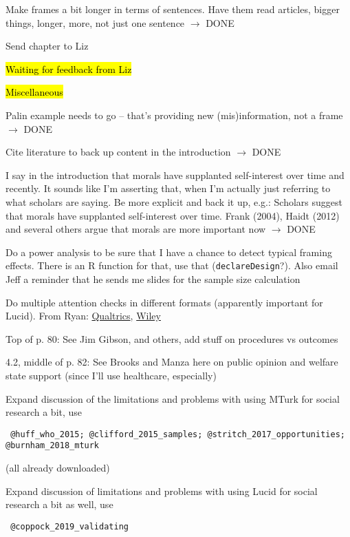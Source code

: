 \begin{coi}
\begin{coi}
				\item Make frames a bit longer in terms of sentences. Have them read articles, bigger things, longer, more, not just one sentence $\rightarrow$ DONE
			\end{coi}
		\item Send chapter to Liz
		\item \hl{Waiting for feedback from Liz}
		\item \hl{Miscellaneous}
			\begin{coi}
				\item Palin example needs to go -- that's providing new (mis)information, not a frame $\rightarrow$ DONE
				\item Cite literature to back up content in the introduction $\rightarrow$ DONE
				\item I say in the introduction that morals have supplanted self-interest over time and recently. It sounds like I'm asserting that, when I'm actually just referring to what scholars are saying. Be more explicit and back it up, e.g.: Scholars suggest that morals have supplanted self-interest over time. Frank (2004), Haidt (2012) and several others argue that morals are more important now $\rightarrow$ DONE
				\item Do a power analysis to be sure that I have a chance to detect typical framing effects. There is an R function for that, use that (\texttt{declareDesign}?). Also 	email Jeff a reminder that he sends me slides for the sample size calculation
				\item Do multiple attention checks in different formats (apparently important for Lucid). From Ryan: \href{https://www.qualtrics.com/blog/using-attention-checks-in-your-surveys-may-harm-data-quality/}{Qualtrics}, \href{https://onlinelibrary.wiley.com/doi/10.1111/ajps.12396}{Wiley}
				\item Top of p. 80:  See Jim Gibson, and others, add stuff on procedures vs outcomes
				\item 4.2, middle of p. 82: See Brooks and Manza here on public opinion and welfare state support (since I'll use healthcare, especially)
				\item Expand discussion of the limitations and problems with using MTurk for social research a bit, use \begin{verbatim} @huff_who_2015; @clifford_2015_samples; @stritch_2017_opportunities; @burnham_2018_mturk \end{verbatim} (all already downloaded)
				\item Expand discussion of limitations and problems with using Lucid for social research a bit as well, use \begin{verbatim} @coppock_2019_validating \end{verbatim}
			\end{coi}
	\end{coi}
	

